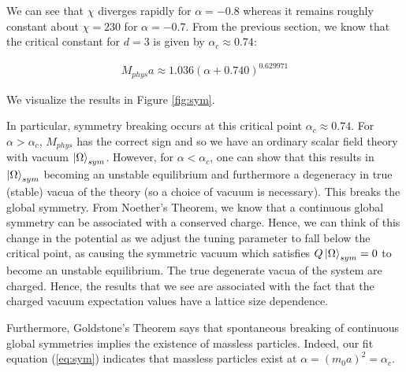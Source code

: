 \documentclass[12]{report}
\newcommand\0{\mathbf{0}}
\newcommand\<{\langle}
\renewcommand\>{\rangle}
\begin{document}
We can see that $\chi$ diverges rapidly for $\alpha = -0.8$ whereas it remains roughly constant about $\chi = 230$ for $\alpha = -0.7$. From the previous section, we know that the critical constant for $d=3$ is given by $\alpha_c \approx 0.74$:

\begin{align}
\label{eq:sym}
	M_{phys}a \approx 1.036(\alpha + 0.740)^{0.629971}
\end{align}

We visualize the results in Figure \ref{fig:sym}.


In particular, symmetry breaking occurs at this critical point $\alpha_c \approx 0.74$. For $\alpha > \alpha_c$, $M_{phys}$ has the correct sign and so we have an ordinary scalar field theory with vacuum $\ket{\Omega}_{sym}$. However, for $\alpha < \alpha_c$, one can show that this results in $\ket{\Omega}_{sym}$ becoming an unstable equilibrium and furthermore a degeneracy in true (stable) vacua of the theory (so a choice of vacuum is necessary). This breaks the global symmetry. From Noether's Theorem, we know that a continuous global symmetry can be associated with a conserved charge. Hence, we can think of this change in the potential as we adjust the tuning parameter to fall below the critical point, as causing the symmetric vacuum which satisfies $Q\ket{\Omega}_{sym} = 0$ to become an unstable equilibrium. The true degenerate vacua of the system are charged. Hence, the results that we see are associated with the fact that the charged vacuum expectation values have a lattice size dependence.

Furthermore, Goldstone's Theorem says that spontaneous breaking of continuous global symmetries implies the existence of massless particles. Indeed, our fit equation (\ref{eq:sym}) indicates that massless particles exist at $\alpha = (m_0a)^2 = \alpha_c$.
\end{document}
